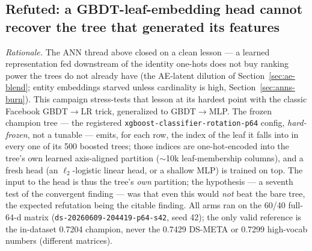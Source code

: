\documentclass[11pt]{article}
\newcommand{\dsid}[1]{\texttt{\small #1}}
\begin{document}
\subsection{Refuted: a GBDT-leaf-embedding head cannot recover the tree that generated its features}
\label{sec:leaf-head}
\emph{Rationale.} The ANN thread above closed on a clean lesson --- a learned
representation fed downstream of the identity one-hots does not buy ranking
power the trees do not already have (the AE-latent dilution of
Section~\ref{sec:ae-blend}; entity embeddings starved unless cardinality is
high, Section~\ref{sec:anns-burn}). This campaign stress-tests that lesson at
its hardest point with the classic Facebook GBDT$\to$LR trick, generalized to
GBDT$\to$MLP. The frozen champion tree --- the registered
\texttt{xgboost-classifier-rotation-p64} config, \emph{hard-frozen}, not a
tunable --- emits, for each row, the index of the leaf it falls into in every
one of its 500 boosted trees; those indices are one-hot-encoded into the tree's
own learned axis-aligned partition ($\sim$10k leaf-membership columns), and a
fresh head (an $\ell_2$-logistic linear head, or a shallow MLP) is trained on
top. The input to the head is thus the tree's \emph{own} partition; the
hypothesis --- a seventh test of the convergent finding --- was that even this
would \emph{not} beat the bare tree, the expected refutation being the citable
finding. All arms ran on the 60/40 full-64-d matrix
(\dsid{ds-20260609-204419-p64-s42}, seed 42); the only valid reference is the
in-dataset \num{0.7204} champion, never the \num{0.7429} DS-META or
\num{0.7299} high-vocab numbers (different matrices).
\end{document}
